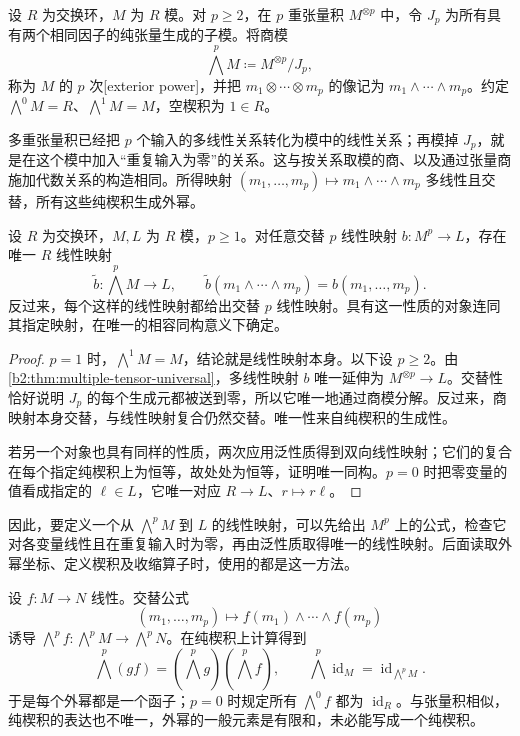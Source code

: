 \begin{definition}\label{b2:def:exterior-power}
	设 \(R\) 为交换环，\(M\) 为 \(R\) 模。对 \(p\ge2\)，在 \(p\) 重张量积 \(M^{\otimes p}\) 中，令 \(J_p\) 为所有具有两个相同因子的纯张量生成的子模。将商模
	\[
		\bigwedge^p M\coloneqq M^{\otimes p}/J_p,
	\]
	称为 \(M\) 的 \(p\) 次[exterior power]，并把 \(m_1\otimes\cdots\otimes m_p\) 的像记为 \(m_1\wedge\cdots\wedge m_p\)。约定 \(\bigwedge^0M=R\)、\(\bigwedge^1M=M\)，空楔积为 \(1\in R\)。
\end{definition}

多重张量积已经把 \(p\) 个输入的多线性关系转化为模中的线性关系；再模掉 \(J_p\)，就是在这个模中加入“重复输入为零”的关系。这与按关系取模的商、以及通过张量商施加代数关系的构造相同。所得映射 \((m_1,\ldots,m_p)\mapsto m_1\wedge\cdots\wedge m_p\) 多线性且交替，所有这些纯楔积生成外幂。

\begin{proposition}[外幂的泛性质]\label{b2:prop:exterior-alternating-universal}
	设 \(R\) 为交换环，\(M,L\) 为 \(R\) 模，\(p\ge1\)。对任意交替 \(p\) 线性映射 \(b:M^p\to L\)，存在唯一 \(R\) 线性映射
	\[
		\widetilde b:\bigwedge^pM\longrightarrow L, \qquad \widetilde b(m_1\wedge\cdots\wedge m_p)=b(m_1,\ldots,m_p).
	\]
	反过来，每个这样的线性映射都给出交替 \(p\) 线性映射。具有这一性质的对象连同其指定映射，在唯一的相容同构意义下确定。
\end{proposition}
\begin{proof}
	\(p=1\) 时，\(\bigwedge^1M=M\)，结论就是线性映射本身。以下设 \(p\ge2\)。由\cref{b2:thm:multiple-tensor-universal}，多线性映射 \(b\) 唯一延伸为 \(M^{\otimes p}\to L\)。交替性恰好说明 \(J_p\) 的每个生成元都被送到零，所以它唯一地通过商模分解。反过来，商映射本身交替，与线性映射复合仍然交替。唯一性来自纯楔积的生成性。

	若另一个对象也具有同样的性质，两次应用泛性质得到双向线性映射；它们的复合在每个指定纯楔积上为恒等，故处处为恒等，证明唯一同构。\(p=0\) 时把零变量的值看成指定的 \(\ell\in L\)，它唯一对应 \(R\to L\)、\(r\mapsto r\ell\)。
\end{proof}

因此，要定义一个从 \(\bigwedge^pM\) 到 \(L\) 的线性映射，可以先给出 \(M^p\) 上的公式，检查它对各变量线性且在重复输入时为零，再由泛性质取得唯一的线性映射。后面读取外幂坐标、定义楔积及收缩算子时，使用的都是这一方法。

\ProseParagraphBreak
设 \(f:M\to N\) 线性。交替公式
\[
	(m_1,\ldots,m_p)\longmapsto f(m_1)\wedge\cdots\wedge f(m_p)
\]
诱导 \(\bigwedge^p f:\bigwedge^pM\to\bigwedge^pN\)。在纯楔积上计算得到
\begin{equation}\label{b2:eq:exterior-functoriality}
	\bigwedge^p(gf)=\left(\bigwedge^p g\right)\left(\bigwedge^p f\right), \qquad \bigwedge^p\operatorname{id}_M=\operatorname{id}_{\bigwedge^pM}.
\end{equation}
于是每个外幂都是一个函子；\(p=0\) 时规定所有 \(\bigwedge^0 f\) 都为 \(\operatorname{id}_R\)。与张量积相似，纯楔积的表达也不唯一，外幂的一般元素是有限和，未必能写成一个纯楔积。

